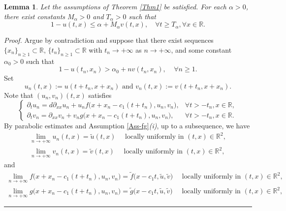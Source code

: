 \documentclass[10pt]{article}
\numberwithin{equation}{section}
\newcommand{\R}{\mathbb{R}}
\newtheorem{lemma}[theorem]{Lemma}
\newenvironment{proof}[1][Proof]{\noindent\textit{#1.} }{\hfill \rule{0.5em}{0.5em}}
\begin{document}
\begin{lemma}\label{Lem-estimate}
Let the assumptions of  Theorem \ref{Thm1} be satisfied.   For each $\alpha>0$, there exist  constants  $M_{\alpha}>0$ and $T_{\alpha} >0$ such that 
\begin{equation*}
1-u(t,x) \leq \alpha+ M_{\alpha} v(t,x), \quad \forall t\geq T_{\alpha}, \forall x\in\R.
\end{equation*}
\end{lemma}
\begin{proof}
Argue by contradiction and suppose that there exist  sequences $\{x_n\}_{n\geq 1} \subset \R $,  $\{t_n\}_{n\geq 1} \subset \R$ with  $t_n \to +\infty$ as $n \to +\infty$,     and some constant  $\alpha_0>0 $  such that 
\begin{equation} \label{contra1}
1-u(t_n, x_n) > \alpha_0 + n  v(t_n, x_n), \;\;\;\; \forall n\geq 1.
\end{equation}
Set
\begin{equation*}
u_n(t,x) := u(t+t_n, x+x_n) \text{ and } v_n(t,x) := v(t+t_n, x+x_n). 
\end{equation*}
Note that $(u_n, v_n) (t,x)$ satisfies 
\begin{equation*}
\begin{cases}
\partial_t u_n= d \partial_{xx} u_n +   u_n f \big( x+x_n -c_1(t+t_n), u_n, v_n \big), & \forall t>-t_n, x\in \R, \\
\partial_t v_n =  \partial_{xx} v_n   + v_n  g\big(  x+x_n -c_1(t+t_n), u_n,   v_n  \big), & \forall t>-t_n, x\in \R.
\end{cases}
\end{equation*}
By parabolic estimates and Assumption \ref{Ass-fg}\textit{(i)}, up to a subsequence, we have 
\begin{align*}
\lim_{n\to +\infty} u_n(t,x) = \tilde{u}(t,x) \quad \text{ locally uniformly in }  (t,x) \in \R^2, \\
\lim_{n\to +\infty} v_n(t,x) = \tilde{v}(t,x) \quad  \text{ locally uniformly in }  (t,x) \in \R^2,
\end{align*}
and 
\begin{align*}
\lim_{n\to +\infty} f \big( x+x_n -c_1(t+t_n), u_n, v_n \big) = \tilde{f} \big( x-c_1t, \tilde{u}, \tilde{v} \big) \quad \text{ locally uniformly in }  (t,x) \in \R^2, \\
\lim_{n\to +\infty} g \big( x+x_n -c_1(t+t_n), u_n, v_n \big) = \tilde{g} \big( x-c_1t, \tilde{u}, \tilde{v} \big) \quad \text{ locally uniformly in }  (t,x) \in \R^2,
\end{align*}

\end{proof}
\end{document}

